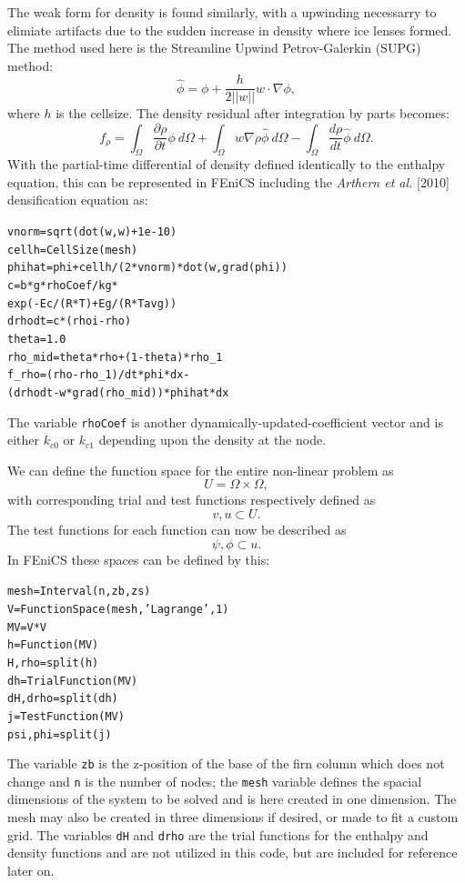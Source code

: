 \documentclass{article}%
\begin{document}
The weak form for density is found similarly, with a upwinding necessarry to elimiate artifacts due to the sudden increase in density where ice lenses formed.  The method used here is the Streamline Upwind Petrov-Galerkin (SUPG) method:
  $$
    \hat{\phi} = \phi + \frac{h}{2||w||} w \cdot \nabla{\phi},
  $$
where $h$ is the cellsize.  The density residual after integration by parts becomes:
  $$
  f_{\rho} = 
    \int_{\Omega} \frac{\partial \rho}{\partial t}\phi\ d \Omega + 
    \int_{\Omega} w\nabla \rho \hat{\phi}\ d \Omega -
    \int_{\Omega}\frac{d \rho}{dt}\hat{\phi}\ d \Omega.
  $$
With the partial-time differential of density defined identically to the enthalpy equation, this can be represented in FEniCS including the \emph{Arthern et al.} [2010] densification equation as:\par
\footnotesize
\begin{alltt}
vnorm   = sqrt(dot(w, w) + 1e-10)
cellh   = CellSize(mesh)
phihat  = phi + cellh/(2*vnorm)*dot(w, grad(phi))
c       = b*g*rhoCoef/kg * 
          exp(-Ec/(R*T) + Eg/(R*Tavg))
drhodt  = c*(rhoi - rho)
theta   = 1.0
rho_mid = theta*rho + (1 - theta)*rho_1
f_rho   = (rho - rho_1)/dt*phi*dx - 
          (drhodt - w*grad(rho_mid))*phihat*dx
\end{alltt}
\normalsize
The variable \texttt{rhoCoef} is another dynamically-updated-coefficient vector and is either $k_{c0}$ or $k_{c1}$ depending upon the density at the node.

We can define the function space for the entire non-linear problem as 
  $$
    U = \Omega \times \Omega,
  $$
with corresponding trial and test functions respectively defined as
  $$
    v, u \subset U.
  $$
The test functions for each function can now be described as
  $$
    \psi, \phi \subset u.
  $$
In FEniCS these spaces can be defined by this:
\footnotesize
\begin{alltt}
mesh     = Interval(n, zb, zs)
V        = FunctionSpace(mesh, 'Lagrange', 1)
MV       = V*V
h        = Function(MV)
H,rho    = split(h)    
dh       = TrialFunction(MV)
dH, drho = split(dh)
j        = TestFunction(MV)
psi, phi = split(j)
\end{alltt}
\normalsize
The variable \texttt{zb} is the z-position of the base of the firn column which does not change and \texttt{n} is the number of nodes; the \texttt{mesh} variable defines the spacial dimensions of the system to be solved and is here created in one dimension.  The mesh may also be created in three dimensions if desired, or made to fit a custom grid.  The variables \texttt{dH} and \texttt{drho} are the trial functions for the enthalpy and density functions and are not utilized in this code, but are included for reference later on.
\end{document}
